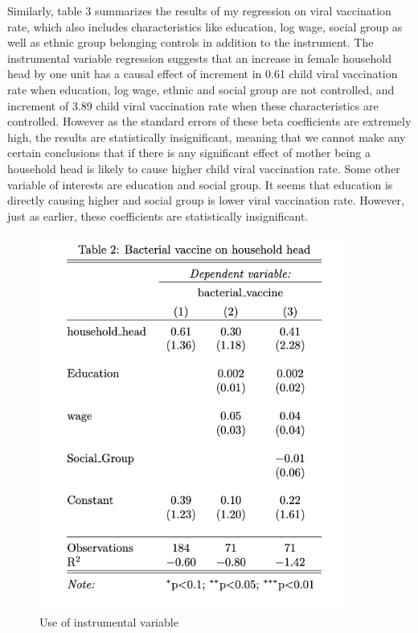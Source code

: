 \documentclass[12pt]{article}
\begin{document}
Similarly, table 3 summarizes the results of my regression on viral vaccination rate, which also includes characteristics like education, log wage, social group as well as ethnic group belonging controls in addition to the instrument. The instrumental variable regression suggests that an increase in female household head by one unit has a causal effect of increment in 0.61 child viral vaccination rate when education, log wage, ethnic and social group are not controlled, and increment of 3.89 child viral vaccination rate when these characteristics are controlled. However as the standard errors of these beta coefficients are extremely high, the results are statistically insignificant, meaning that we cannot make any certain conclusions that if there is any significant effect of mother being a household head is likely to cause higher child viral vaccination rate. Some other variable of interests are education and social group. It seems that education is directly causing higher and social group is lower viral vaccination rate. However, just as earlier, these coefficients are statistically insignificant.

\begin{figure}[H]
    \centering
    \includegraphics[width=0.9\textwidth]{bacterial_vaccine_reg.png}
    \caption{Use of instrumental variable}
    \label{Table of Summary Statistics}
\end{figure}
\end{document}

